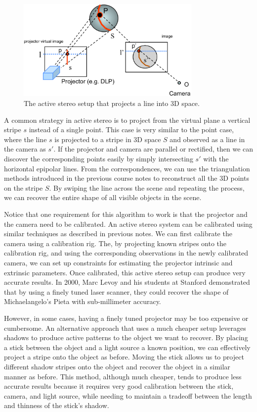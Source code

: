 \documentclass[a4paper, 12pt]{article}
\numberwithin{equation}{section}
\begin{document}
\begin{figure}[h!]
    \centering
    \includegraphics[width = 0.8\textwidth]{figures/active_stereo_line.png}
    \caption{The active stereo setup that projects a line into 3D space.}
    \label{fig:active_stereo_line}
\end{figure}

A common strategy in active stereo is to project from the virtual plane a vertical stripe $s$ instead of a single point. This case is very similar to the point case, where the line $s$ is projected to a stripe in 3D space $S$ and observed as a line in the camera as $s'$. If the projector and camera are parallel or rectified, then we can discover the corresponding points easily by simply intersecting $s'$ with the horizontal epipolar lines. From the correspondences, we can use the triangulation methods introduced in the previous course notes to reconstruct all the 3D points on the stripe $S$. By swiping the line across the scene and repeating the process, we can recover the entire shape of all visible objects in the scene. 

Notice that one requirement for this algorithm to work is that the projector and the camera need to be calibrated. An active stereo system can be calibrated using similar techniques as described in previous notes. We can first calibrate the camera using a calibration rig. The, by projecting known stripes onto the calibration rig, and using the corresponding observations in the newly calibrated camera, we can set up constraints for estimating the projector intrinsic and extrinsic parameters. Once calibrated, this active stereo setup can produce very accurate results. In 2000, Marc Levoy and his students at Stanford demonstrated that by using a finely tuned laser scanner, they could recover the shape of Michaelangelo's Pieta with sub-millimeter accuracy.

However, in some cases, having a finely tuned projector may be too expensive or cumbersome. An alternative approach that uses a much cheaper setup leverages shadows to produce active patterns to the object we want to recover. By placing a stick between the object and a light source a known position, we can effectively project a stripe onto the object as before. Moving the stick allows us to project different shadow stripes onto the object and recover the object in a similar manner as before. This method, although much cheaper, tends to produce less accurate results because it requires very good calibration between the stick, camera, and light source, while needing to maintain a tradeoff between the length and thinness of the stick's shadow.
\end{document}
